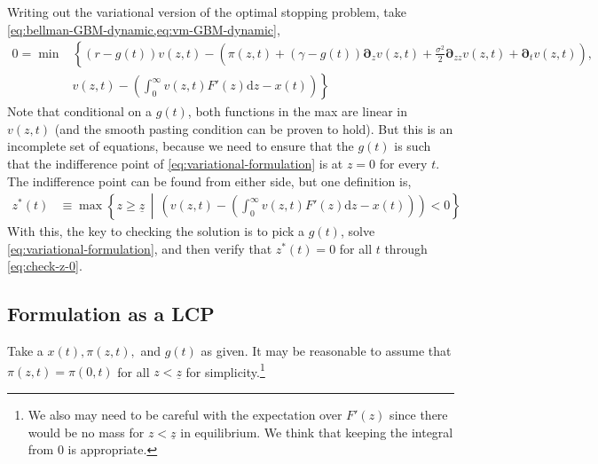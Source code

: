 \documentclass[11pt]{article}
\newcommand{\D}[1][]{\ensuremath{\boldsymbol{\partial}_{#1}}}
\newcommand{\diff}{\ensuremath{\mathrm{d}}}
\begin{document}
Writing out the variational version of the optimal stopping problem, take \cref{eq:bellman-GBM-dynamic,eq:vm-GBM-dynamic},
\begin{align}
	0 = \min&\left\{(r - g(t)) v(z,t) - \left(\pi(z,t) + (\gamma - g(t)) \D[z] v(z,t) + \tfrac{\sigma^2}{2} \D[zz] v(z,t) + \D[t]v(z,t)\right),\right.\nonumber\\
	&\left.v(z,t)-\left(\int_{0}^{\infty} v(z,t) F'(z)\diff z - x(t)\right)\right\}\label{eq:variational-formulation}
\end{align}
Note that conditional on a $g(t)$, both functions in the max are linear in $v(z,t)$ (and the smooth pasting condition can be proven to hold).  But this is an incomplete set of equations, because we need to ensure that the $g(t)$ is such that the indifference point of \cref{eq:variational-formulation} is at $z=0$ for every $t$.  The indifference point can be found from either side, but one definition is,
\begin{align}
	z^*(t) &\equiv \max\left\{z \geq \underline{z}\,\middle|\,\left(v(z,t)-\left(\int_{0}^{\infty} v(z,t) F'(z)\diff z - x(t)\right)\right) < 0\right\}\label{eq:check-z-0}
\end{align}
With this, the key to checking the solution is to pick a $g(t)$, solve \cref{eq:variational-formulation}, and then verify that $z^*(t) =0$ for all $t$ through \cref{eq:check-z-0}.

\subsection{Formulation as a LCP}
Take a $x(t), \pi(z,t),$ and $g(t)$ as given.  It may be reasonable to assume that $\pi(z,t) = \pi(0,t)$ for all $z < \underline{z}$ for simplicity.\footnote{We also may need to be careful with the expectation over $F'(z)$ since there would be no mass for $z < \underline{z}$ in equilibrium.  We think that keeping the integral from $0$ is appropriate.}
\end{document}
